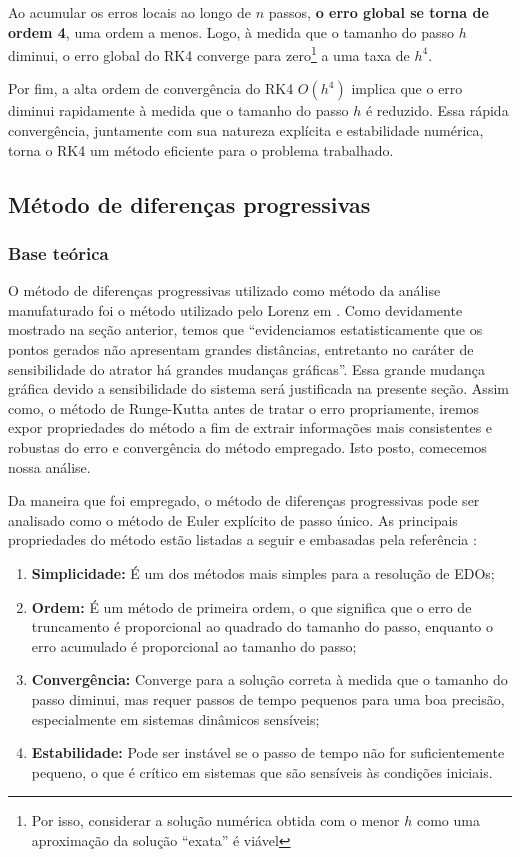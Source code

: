 \documentclass[12pt, a4paper]{article}
\begin{document}
Ao acumular os erros locais ao longo de $n$ passos, \textbf{o erro global se torna de ordem 4}, uma ordem a menos. Logo, à medida que o tamanho do passo $h$ diminui, o erro global do RK4 converge para zero\footnote{Por isso, considerar a solução numérica obtida com o menor $h$ como uma aproximação da solução ``exata'' é viável} a uma taxa de $h^4$.

Por fim, a  alta ordem de convergência do RK4 $O(h^4)$ implica que o erro diminui rapidamente à medida que o tamanho do passo $h$ é reduzido. Essa rápida convergência, juntamente com sua natureza explícita e estabilidade numérica, torna o RK4 um método eficiente para o problema trabalhado.


\subsection{Método de diferenças progressivas}
\subsubsection{Base teórica}
O método de diferenças progressivas utilizado como método da análise manufaturado foi o método utilizado pelo Lorenz em \cite{Lorenz1963}. Como devidamente mostrado na seção anterior, temos que ``evidenciamos estatisticamente que os pontos gerados não apresentam grandes distâncias, entretanto no caráter de sensibilidade do atrator há grandes mudanças gráficas''. Essa grande mudança gráfica devido a sensibilidade do sistema será justificada na presente seção. Assim como, o método de Runge-Kutta antes de tratar o erro propriamente, iremos expor propriedades do método a fim de extrair informações mais consistentes e robustas do erro e convergência do método empregado. Isto posto, comecemos nossa análise.

Da maneira que foi empregado, o método de diferenças progressivas pode ser analisado como o método de Euler explícito de passo único. As principais propriedades do método estão listadas a seguir e embasadas pela referência \cite{Fontana2018}:
    \begin{enumerate}
        \item \textbf{Simplicidade:} É um dos métodos mais simples para a resolução de EDOs;
        \item \textbf{Ordem:} É um método de primeira ordem, o que significa que o erro de truncamento é proporcional ao quadrado do tamanho do passo, enquanto o erro acumulado é proporcional ao tamanho do passo;
        \item \textbf{Convergência:} Converge para a solução correta à medida que o tamanho do passo diminui, mas requer passos de tempo pequenos para uma boa precisão, especialmente em sistemas dinâmicos sensíveis;
        \item \textbf{Estabilidade:} Pode ser instável se o passo de tempo não for suficientemente pequeno, o que é crítico em sistemas que são sensíveis às condições iniciais.
    \end{enumerate}
\end{document}
